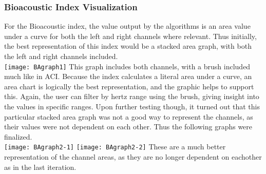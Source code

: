 \subsubsection{Bioacoustic Index Visualization}
For the Bioacoustic index, the value output by the algorithms is an area value under a curve for both the left and right channels where relevant. Thus initially, the best representation of this index would be a stacked area graph, with both the left and right channels included.\\

\texttt{[image: BAgraph1]}
This graph includes both channels, with a brush included much like in ACI. Because the index calculates a literal area under a curve, an area chart is logically the best representation, and the graphic helps to support this. Again, the user can filter by hertz range using the brush, giving insight into the values in specific ranges. Upon further testing though, it turned out that this particular stacked area graph was not a good way to represent the channels, as their values were not dependent on each other. Thus the following graphs were finalized.\\

\texttt{[image: BAgraph2-1]}
\texttt{[image: BAgraph2-2]}
These are a much better representation of the channel areas, as they are no longer dependent on eachother as in the last iteration.
